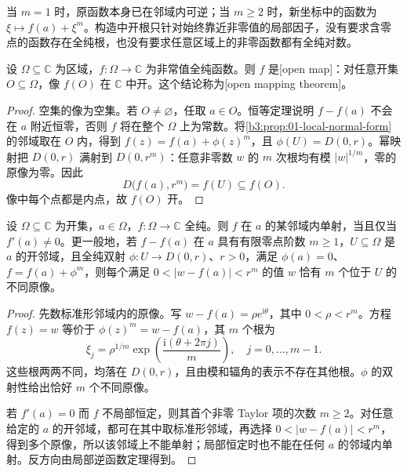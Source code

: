 当 \(m=1\) 时，原函数本身已在邻域内可逆；当 \(m\geq2\) 时，新坐标中的函数为 \(\xi\mapsto f(a)+\xi^m\)。构造中开根只针对始终靠近非零值的局部因子，没有要求含零点的函数存在全纯根，也没有要求任意区域上的非零函数都有全纯对数。

\begin{theorem}[开映射]\label{b3:thm:01-open-mapping}
设 \(\Omega\subseteq\mathbb C\) 为区域，\(f:\Omega\to\mathbb C\) 为非常值全纯函数。则 \(f\) 是[open map]：对任意开集 \(O\subseteq\Omega\)，像 \(f(O)\) 在 \(\mathbb C\) 中开。这个结论称为[open mapping theorem]。
\end{theorem}
\begin{proof}
空集的像为空集。若 \(O\ne\varnothing\)，任取 \(a\in O\)。恒等定理说明 \(f-f(a)\) 不会在 \(a\) 附近恒零，否则 \(f\) 将在整个 \(\Omega\) 上为常数。将\cref{b3:prop:01-local-normal-form}的邻域取在 \(O\) 内，得到 \(f(z)=f(a)+\phi(z)^m\)，且 \(\phi(U)=D(0,r)\)。幂映射把 \(D(0,r)\) 满射到 \(D(0,r^m)\)：任意非零数 \(w\) 的 \(m\) 次根均有模 \(|w|^{1/m}\)，零的原像为零。因此
\[
D\bigl(f(a),r^m\bigr)=f(U)\subseteq f(O).
\]
像中每个点都是内点，故 \(f(O)\) 开。
\end{proof}

\begin{corollary}\label{b3:cor:01-local-injectivity}
设 \(\Omega\subseteq\mathbb C\) 为开集，\(a\in\Omega\)，\(f:\Omega\to\mathbb C\) 全纯。则 \(f\) 在 \(a\) 的某邻域内单射，当且仅当 \(f'(a)\ne0\)。更一般地，若 \(f-f(a)\) 在 \(a\) 具有有限零点阶数 \(m\ge1\)，\(U\subseteq\Omega\) 是 \(a\) 的开邻域，且全纯双射 \(\phi:U\to D(0,r)\)、\(r>0\)，满足 \(\phi(a)=0\)、\(f=f(a)+\phi^m\)，则每个满足 \(0<|w-f(a)|<r^m\) 的值 \(w\) 恰有 \(m\) 个位于 \(U\) 的不同原像。
\end{corollary}
\begin{proof}
先数标准形邻域内的原像。写 \(w-f(a)=\rho e^{\mathrm{i}\theta}\)，其中 \(0<\rho<r^m\)。方程 \(f(z)=w\) 等价于 \(\phi(z)^m=w-f(a)\)，其 \(m\) 个根为
\[
 \xi_j=\rho^{1/m}\exp\left(\frac{\mathrm{i}(\theta+2\pi j)}m\right),
 \quad j=0,\ldots,m-1.
\]
这些根两两不同，均落在 \(D(0,r)\)，且由模和辐角的表示不存在其他根。\(\phi\) 的双射性给出恰好 \(m\) 个不同原像。

若 \(f'(a)=0\) 而 \(f\) 不局部恒定，则其首个非零 Taylor 项的次数 \(m\ge2\)。对任意给定的 \(a\) 的开邻域，都可在其中取标准形邻域，再选择 \(0<|w-f(a)|<r^m\)，得到多个原像，所以该邻域上不能单射；局部恒定时也不能在任何 \(a\) 的邻域内单射。反方向由局部逆函数定理得到。
\end{proof}

